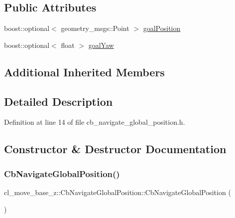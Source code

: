 \subsection*{Public Attributes}
\begin{DoxyCompactItemize}
\item 
boost\+::optional$<$ geometry\+\_\+msgs\+::\+Point $>$ \hyperlink{classcl__move__base__z_1_1CbNavigateGlobalPosition_a51a0266fd9a63e99f26e88933529c559}{goal\+Position}
\item 
boost\+::optional$<$ float $>$ \hyperlink{classcl__move__base__z_1_1CbNavigateGlobalPosition_a839900de7f664b27c9be189fadbaa003}{goal\+Yaw}
\end{DoxyCompactItemize}
\subsection*{Additional Inherited Members}


\subsection{Detailed Description}


Definition at line 14 of file cb\+\_\+navigate\+\_\+global\+\_\+position.\+h.



\subsection{Constructor \& Destructor Documentation}
\mbox{\label{classcl__move__base__z_1_1CbNavigateGlobalPosition_aec75d2481b2057bbbdad9513c4dc08cd}} 
\subsubsection{\texorpdfstring{Cb\+Navigate\+Global\+Position()}{CbNavigateGlobalPosition()}\hspace{0.1cm}{\footnotesize\ttfamily [1/2]}}
{\footnotesize\ttfamily cl\+\_\+move\+\_\+base\+\_\+z\+::\+Cb\+Navigate\+Global\+Position\+::\+Cb\+Navigate\+Global\+Position (\begin{DoxyParamCaption}{ }\end{DoxyParamCaption})}



